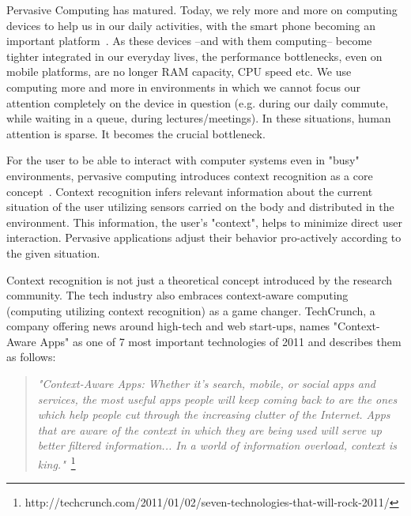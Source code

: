 Pervasive Computing has matured. Today, we rely more and more on computing devices to help us in our daily activities, with the smart phone becoming an important platform~\cite{Chronis:2009p7854,Krause:2006p1884,Ofstad:2008p7556,Choudhury:2010p5381,hinckley2001tms}. As these devices --and with them computing-- become tighter integrated in our everyday lives, the performance bottlenecks, even on mobile platforms, are no longer RAM capacity, CPU speed etc. We use computing more and more in environments in which we cannot focus our attention completely on the device in question (e.g. during our daily commute, while waiting in a queue, during lectures/meetings). In these situations, human attention is sparse. It becomes the crucial bottleneck.

For the user to be able to interact with computer systems even in "busy" environments, 
pervasive computing introduces context recognition as a core concept~\cite{tea}. 
Context recognition infers relevant information about the current situation of the user utilizing sensors carried on the body and distributed in the environment.
This information, the user's "context", helps to minimize direct user interaction. Pervasive applications adjust their behavior pro-actively according to the given situation.

Context recognition is not just a theoretical concept introduced by the research community.
The tech industry also embraces context-aware computing (computing utilizing context recognition) as a game changer. TechCrunch, a company offering news around high-tech and web start-ups, names "Context-Aware Apps" as one of 7 most important technologies of 2011 and describes them as follows:

\begin{quote}
\textit{"Context-Aware Apps: Whether it's search, mobile, or social apps and
services, the most useful apps people will keep coming back to are the
ones which help people cut through the increasing clutter of the
Internet. Apps that are aware of the context in which they are being
used will serve up better filtered information... %
In a world of information overload, context is
king."}~\footnote{http://techcrunch.com/2011/01/02/seven-technologies-that-will-rock-2011/} \end{quote}

